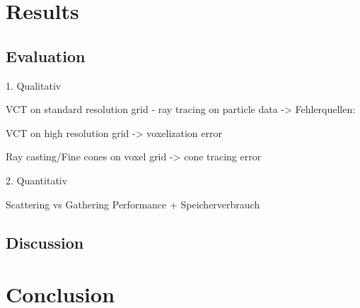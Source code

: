\documentclass[hyperref,german,diplominf]{cgvpub}
\begin{document}
\chapter{Results}

\section{Evaluation}

1. Qualitativ

VCT on standard resolution grid - ray tracing on particle data -> Fehlerquellen:

VCT on high resolution grid -> voxelization error

Ray casting/Fine cones on voxel grid -> cone tracing error

2. Quantitativ

Scattering vs Gathering Performance + Speicherverbrauch

\section{Discussion}

\chapter{Conclusion}

\cite{4}
\cite{5}
\cite{6}
\cite{7}
\cite{8}
\cite{9}
\cite{10}
\cite{11}
\cite{12}
\cite{13}
\cite{14}
\cite{19}
\cite{21}
\cite{22}
\cite{23}
\cite{29}
\cite{30}
\cite{31}
\cite{32}
\cite{33}
\end{document}
